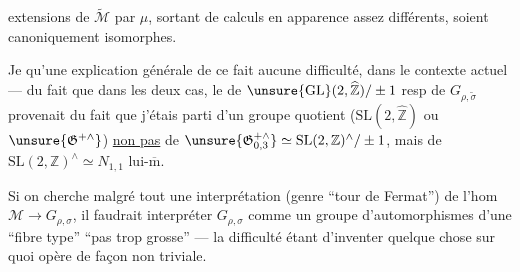 

extensions de $\widetilde{\mathcal M}$ par $\mu$, sortant de calculs en apparence assez différents, soient canoniquement isomorphes.

Je  qu'une explication générale de ce fait  aucune difficulté, dans le contexte actuel --- du fait que dans les deux cas, le  de $\unsure{\mathrm{GL}}(2,\widehat{\mathbb Z})/\pm1$ resp de $G_{\rho,\widetilde\sigma}$ provenait du fait que j'étais parti d'un groupe quotient ($\mathrm{SL}(2,\widehat{\mathbb Z})$ ou $\unsure{\mathfrak G^{+\wedge}}$) \uline{non pas} de $\unsure{\mathfrak G_{0,3}^{+\wedge}}\simeq\mathrm{SL}(2,\mathbb Z)^\wedge/\pm1$, mais de $\mathrm{SL}(2,\mathbb Z)^\wedge\simeq N_{1,1}$ lui-$\overline{\mathrm m}$.

Si on cherche malgré tout une interprétation (genre ``tour de Fermat'') de l'hom $\mathcal M\to G_{\rho,\sigma}$, il faudrait interpréter $G_{\rho,\sigma}$  comme un groupe d'automorphismes d'une ``fibre type'' ``pas trop grosse'' --- la difficulté étant d'inventer quelque chose sur quoi  opère de façon non triviale.



